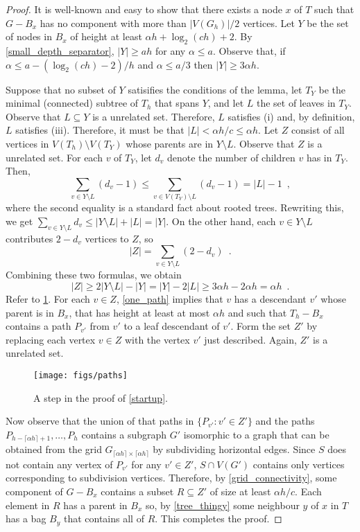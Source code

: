 \documentclass{patmorin}
\renewcommand{\le}{\leqslant}
\renewcommand{\ge}{\geqslant}
\begin{document}
\begin{proof}
  It is well-known and easy to show that there exists a node $x$ of $T$ such that $G-B_x$ has no component with more than $|V(G_h)|/2$ vertices.  Let $Y$ be the set of nodes in $B_x$ of height at least $\alpha h+\log_2(ch)+2$. By \cref{small_depth_separator}, $|Y|\ge ah$ for any $\alpha\le a$.  Observe that, if $\alpha \le a-(\log_2(ch)-2)/h$ and $\alpha \le a/3$ then $|Y|\ge 3\alpha h$.

  Suppose that no subset of $Y$ satisifies the conditions of the lemma, let $T_Y$ be the minimal (connected) subtree of $T_h$ that spans $Y$, and let $L$ the set of leaves in $T_Y$.  Observe that $L\subseteq Y$ is a unrelated set. Therefore, $L$ satisfies (i) and, by definition, $L$ satisfies (iii).  Therefore, it must be that $|L|<\alpha h/c\le\alpha h$.  Let $Z$ consist of all vertices in $V(T_h)\setminus V(T_Y)$ whose parents are in $Y\setminus L$.   Observe that $Z$ is a unrelated set. For each $v$ of $T_Y$, let $d_v$ denote the number of children $v$ has in $T_Y$.  Then,
  \[
     \sum_{v\in Y\setminus L} (d_v-1) 
     \le \sum_{v\in V(T_Y)\setminus L} (d_v-1)
     = |L|-1 \enspace ,
  \]
  where the second equality is a standard fact about rooted trees.
  Rewriting this, we get $\sum_{v\in Y\setminus L} {d_v} \le |Y\setminus L| + |L| = |Y|$.  On the other hand, each $v\in Y\setminus L$ contributes $2-d_v$ vertices to $Z$, so
  \[
    |Z| = \sum_{v\in Y\setminus L} (2-d_v) \enspace .
  \]
  Combining these two formulas, we obtain
  \[
    |Z| \ge 2|Y\setminus L| - |Y| = |Y| - 2|L| \ge 
     3\alpha h - 2\alpha h = \alpha h \enspace .
  \]
  Refer to \cref{paths}.  For each $v\in Z$, \cref{one_path} implies that $v$ has a descendant $v'$ whose parent is in $B_x$, that has height at least at most $\alpha h$ and such that $T_h-B_x$ contains a path $P_{v'}$ from $v'$ to a leaf descendant of $v'$.  Form the set $Z'$ by replacing each vertex $v\in Z$ with the vertex $v'$ just described.  Again, $Z'$ is a unrelated set.

  \begin{figure}
    \begin{center}
      \texttt{[image: figs/paths]}
    \end{center}
    \caption{A step in the proof of \cref{startup}.}
    \label{paths}
  \end{figure}

  Now observe that the union of that paths in  $\{P_{v'}:v'\in Z'\}$ and the paths $P_{h-\lceil\alpha h\rceil+1},\ldots,P_{h}$ contains a subgraph $G'$ isomorphic to a graph that can be obtained from the grid $G_{\lceil\alpha h\rceil\times\lceil\alpha h\rceil}$ by subdividing horizontal edges.  Since $S$ does not contain any vertex of $P_{v'}$ for any $v'\in Z'$,  $S\cap V(G')$ contains only vertices corresponding to subdivision vertices.  Therefore, by \cref{grid_connectivity}, some component of $G-B_x$ contains a subset $R\subseteq Z'$ of size at least $\alpha h/c$.  Each element in $R$ has a parent in $B_x$ so, by \cref{tree_thingy} some neighbour $y$ of $x$ in $T$ has a bag $B_y$ that contains all of $R$.  This completes the proof.
\end{proof}
\end{document}
